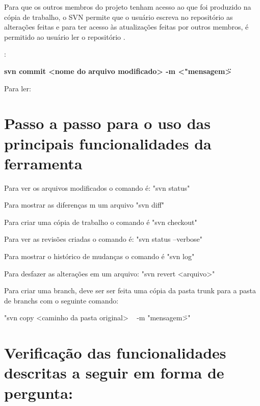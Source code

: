 Para que os outros membros do projeto tenham acesso ao que foi produzido na cópia de trabalho, o SVN permite que o usuário escreva no repositório as alterações feitas
e para ter acesso às atualizações feitas por outros membros, é permitido ao usuário ler o repositório \cite{svn-book}.

\begin{multicols}{2} 


:{

\colorbox{PineGreen}{
\begin{minipage}{210px}
  \textbf{svn commit <nome do arquivo modificado> -m <"mensagem\">}
\end{minipage}
}
}

Para ler:

\colorbox{PineGreen}{
\begin{minipage}{200px}
\end{minipage}
}

\end{multicols}

\section{Passo a passo para o uso das principais funcionalidades da ferramenta}

Para ver os arquivos modificados o comando é: "svn status"

Para mostrar as diferenças m um arquivo "svn diff"

Para criar uma cópia de trabalho o comando é "svn checkout"

Para ver as revisões criadas o comando é: "svn status --verbose"

Para mostrar o histórico de mudanças o comando é "svn log"

Para desfazer as alterações em um arquivo: "svn revert <arquivo>"

Para criar uma branch, deve ser ser feita uma cópia da pasta trunk para a pasta de branchs com o seguinte comando:

"svn copy <caminho da pasta original> \ <caminho da pasta de destino, essa pasta deve possuir o nome da branch> -m "mensagem\">"

\section{Verificação das funcionalidades descritas a seguir em forma de pergunta:}

